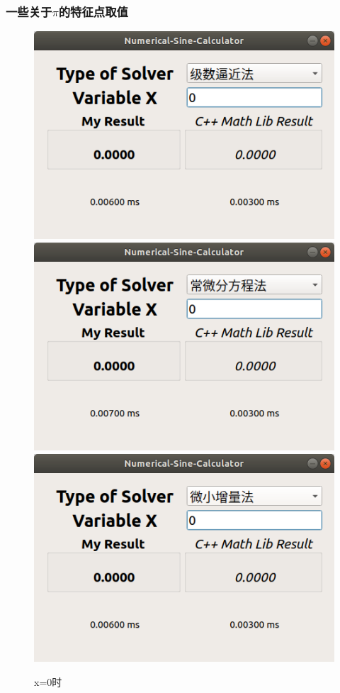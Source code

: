 \documentclass[UTF8]{ctexart}
\begin{document}
\subsubsection{一些关于$\pi$的特征点取值}
\begin{figure}[H]
    \centering
    \includegraphics[scale=0.25]{images/series0.png}
    \includegraphics[scale=0.25]{images/diff0.png}
    \includegraphics[scale=0.25]{images/delta0.png}
    \caption{x=0时}
\end{figure}
\end{document}
